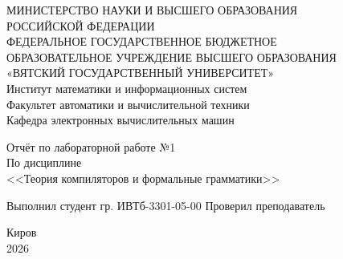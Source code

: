\documentclass[oneside,a4paper,14pt]{extarticle}
\begin{document}
\newpage\thispagestyle{empty}
\begin{center}
	МИНИСТЕРСТВО НАУКИ И ВЫСШЕГО ОБРАЗОВАНИЯ\\
	РОССИЙСКОЙ ФЕДЕРАЦИИ\\
	ФЕДЕРАЛЬНОЕ ГОСУДАРСТВЕННОЕ БЮДЖЕТНОЕ\\
	ОБРАЗОВАТЕЛЬНОЕ УЧРЕЖДЕНИЕ ВЫСШЕГО ОБРАЗОВАНИЯ\\
	«ВЯТСКИЙ ГОСУДАРСТВЕННЫЙ УНИВЕРСИТЕТ»\\
	Институт математики и информационных систем\\
	Факультет автоматики и вычислительной техники\\
	Кафедра электронных вычислительных машин
\end{center}
\vspace{20mm}
\begin{center}
	Отчёт по лабораторной работе №1\\
	По дисциплине\\
	<<Теория компиляторов и формальные грамматики>>\\
\end{center}
\vfill
Выполнил студент гр. ИВТб-3301-05-00 \hfill
{}
Проверил преподаватель\hfill
{}
\vfill
\begin{center}
	Киров\\
	2026
\end{center}
\end{document}
